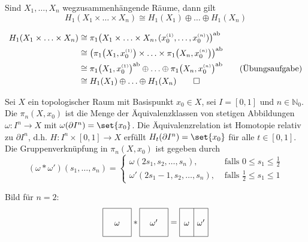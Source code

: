 \begin{korollar}[{name=[Erste Homologiegruppe des Produkts wegzusammenhängender Räume]}]
	Sind $X_1, \ldots , X_n$ wegzusammenhängende Räume, dann gilt
	\[
		H_1(X_1 \times \ldots \times X_n) \cong H_1(X_1) \oplus \ldots \oplus H_1(X_n)
	\]
\end{korollar}
\begin{beweis}
	\begin{align*}
		H_1(X_1 \times \ldots \times X_n) &\cong \pi_1 \enbrace*{X_1 \times \ldots \times X_n, (x_0^\ssbrace{1}, \ldots , x_0^\ssbrace{n})}^{\ab} \\
		&\cong \enbrace*{\pi_1 \enbrace*{X_1,x_0^\ssbrace{1}} \times \ldots \times \pi_1 \enbrace*{X_n, x_0^\ssbrace{n}}}^{\ab} \\
		&\cong \pi_1 \enbrace*{X_1, x_0^\ssbrace{1}}^{\ab} \oplus \ldots \oplus \pi_1 \enbrace*{X_n, x_0^\ssbrace{n}}^{\ab} \tag*{(Übungsaufgabe)} \\
		&\cong H_1(X_1) \oplus \ldots \oplus H_1(X_n) \qedhere
	\end{align*}
\end{beweis}

\begin{definition}[{name=[{n-te absolute Homotopiegruppe}]}]
	Sei $X$ ein topologischer Raum mit Basispunkt $x_0 \in X$, sei $I=[0,1]$ und $n \in \mathbb{N}_0$. 
	Die  $\pi_n(X,x_0)$ ist die Menge der Äquivalenzklassen von stetigen Abbildungen $\omega\colon I^n \to X$ mit $\omega(\partial I^n)=\set{x_0}$. 
	Die Äquivalenzrelation ist Homotopie relativ zu $\partial I^n$, d.h. $H \colon I^n \times [0,1] \to X$ erfüllt $H_t(\partial I^n)= \set{x_0}$ für alle $t \in [0,1]$. 
	Die Gruppenverknüpfung in $\pi_n(X,x_0)$ ist gegeben durch 
	\[
		(\omega * \omega')(s_1,\ldots ,s_n) = \begin{cases}
			\omega(2s_1, s_2, \ldots ,s_n), &\text{ falls }0\le s_1 \le \frac{1}{2} \\
			\omega'(2s_1 -1, s_2, \ldots , s_n) ,&\text{ falls } \frac{1}{2} \le s_1 \le 1
		\end{cases}
	\]
\end{definition}

Bild für $n=2$:
\[	
	\vcenter{\hbox{\begin{tikzpicture}[scale=1.2]
		\draw (0,0) rectangle (1,1);
		\node at (0.5,0.5) {$\omega\vphantom{\omega^\prime}$};
	\end{tikzpicture}}}
	 * 
 	\vcenter{\hbox{\begin{tikzpicture}[,scale=1.2]
 		\draw (0,0) rectangle (1,1);
		\node at (0.5,0.5){$\omega^\prime$};
 	\end{tikzpicture}}}
	= 
	\vcenter{\hbox{\begin{tikzpicture}[scale=1.2]
		\draw (0,0) rectangle (1,1);
		\draw (0.5,0) -- (0.5,1);
		\node at (0.25,0.5) {$\omega\vphantom{\omega^\prime}$};
		\node at (0.75,0.5) {$\omega^\prime$};
	\end{tikzpicture}}}
\]

